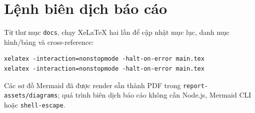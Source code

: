 \documentclass[12pt,a4paper,oneside]{report}
\begin{document}
\section{Lệnh biên dịch báo cáo}

Từ thư mục \texttt{docs}, chạy XeLaTeX hai lần để cập nhật mục lục, danh mục hình/bảng và cross-reference:

\begin{verbatim}
xelatex -interaction=nonstopmode -halt-on-error main.tex
xelatex -interaction=nonstopmode -halt-on-error main.tex
\end{verbatim}

Các sơ đồ Mermaid đã được render sẵn thành PDF trong \texttt{report-assets/diagrams}; quá trình biên dịch báo cáo không cần Node.js, Mermaid CLI hoặc \texttt{shell-escape}.
\end{document}
